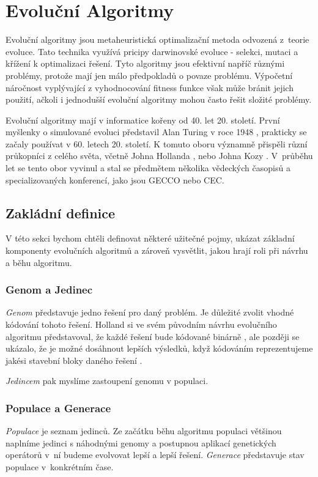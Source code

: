 \chapter{Evoluční Algoritmy}

Evoluční algoritmy jsou metaheuristická optimalizační metoda odvozená z~teorie evoluce. Tato technika využívá pricipy darwinovské evoluce - selekci, mutaci a křížení k optimalizaci řešení. Tyto algoritmy jsou efektivní napříč různými problémy, protože mají jen málo předpokladů o povaze problému. Výpočetní náročnost vyplývající z vyhodnocování fitness funkce však může bránit jejich použití, ačkoli i jednodušší evoluční algoritmy mohou často řešit složité problémy.

Evoluční algoritmy mají v informatice kořeny od 40. let 20. století. První myšlenky o simulované evoluci představil Alan Turing v roce 1948 \cite{Turing1948}, prakticky se začaly používat v 60. letech 20. století. K tomuto oboru významně přispěli různí průkopníci z celého světa, včetně Johna Hollanda \cite{Holland1992}, nebo Johna Kozy \cite{Koza1994}. V~průběhu let se tento obor vyvinul a stal se předmětem několika vědeckých časopisů a specializovaných konferencí, jako jsou GECCO nebo CEC. 

\section{Zakládní definice}
V této sekci bychom chtěli definovat některé užitečné pojmy, ukázat základní komponenty evolučních algoritmů a zároveň vysvětlit, jakou hrají roli při návrhu a běhu algoritmu.

\subsection{Genom a Jedinec}
\emph{Genom} představuje jedno řešení pro daný problém. Je důležité zvolit vhodné kódování tohoto řešení. Holland si ve svém původním návrhu evolučního algoritmu představoval, že každé řešení bude kódované binárně \cite{Holland1992}, ale později se ukázalo, že je možné dosáhnout lepších výsledků, když kódováním reprezentujeme jakési stavební bloky daného řešení \cite{Jones1995Crossover}.

\emph{Jedincem} pak myslíme zastoupení genomu v populaci.

\subsection{Populace a Generace}
\emph{Populace} je seznam jedinců. Ze začátku běhu algoritmu populaci většinou naplníme jedinci s náhodnými genomy a postupnou aplikací genetických operátorů v~ní budeme evolvovat lepší a lepší řešení. \emph{Generace} představuje stav populace v~konkrétním čase.

